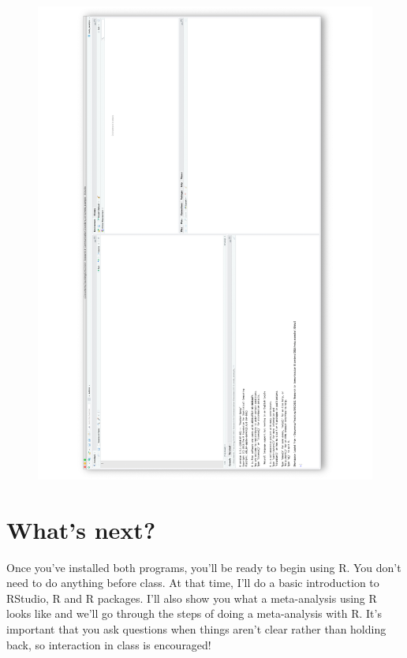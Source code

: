 \documentclass[10pt, a4paper]{article}   	%
\begin{document}
\begin{figure}[h]
\centering
	\includegraphics[angle = 270, width = \textwidth]{images/rstudio_screenshot.pdf}
\end{figure}

\section*{What's next?}
Once you've installed both programs, you'll be ready to begin using R. You don't need to do anything before class. At that time, I'll do a basic introduction to RStudio, R and R packages. I'll also show you what a meta-analysis using R looks like and we'll go through the steps of doing a meta-analysis with R. It's important that you ask questions when things aren't clear rather than holding back, so interaction in class is encouraged! 
\end{document}
